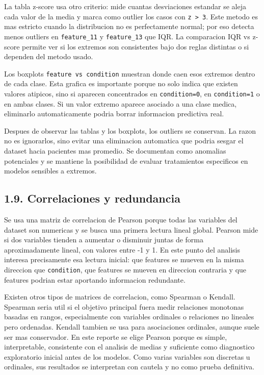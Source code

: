 \documentclass[11pt]{article}
\begin{document}
La tabla z-score usa otro criterio: mide cuantas desviaciones estandar
se aleja cada valor de la media y marca como outlier los casos con
\texttt{\textbar{}z\textbar{}\ \textgreater{}\ 3}. Este metodo es mas
estricto cuando la distribucion no es perfectamente normal; por eso
detecta menos outliers en \texttt{feature\_11} y \texttt{feature\_13}
que IQR. La comparacion IQR vs z-score permite ver si los extremos son
consistentes bajo dos reglas distintas o si dependen del metodo usado.

Los boxplots \texttt{feature\ vs\ condition} muestran donde caen esos
extremos dentro de cada clase. Esta grafica es importante porque no solo
indica que existen valores atipicos, sino si aparecen concentrados en
\texttt{condition=0}, en \texttt{condition=1} o en ambas clases. Si un
valor extremo aparece asociado a una clase medica, eliminarlo
automaticamente podria borrar informacion predictiva real.

Despues de observar las tablas y los boxplots, los outliers se
conservan. La razon no es ignorarlos, sino evitar una eliminacion
automatica que podria sesgar el dataset hacia pacientes mas promedio. Se
documentan como anomalias potenciales y se mantiene la posibilidad de
evaluar tratamientos especificos en modelos sensibles a extremos.

    \subsection{1.9. Correlaciones y
redundancia}\label{correlaciones-y-redundancia}

Se usa una matriz de correlacion de Pearson porque todas las variables
del dataset son numericas y se busca una primera lectura lineal global.
Pearson mide si dos variables tienden a aumentar o disminuir juntas de
forma aproximadamente lineal, con valores entre -1 y 1. En este punto
del analisis interesa precisamente esa lectura inicial: que features se
mueven en la misma direccion que \texttt{condition}, que features se
mueven en direccion contraria y que features podrian estar aportando
informacion redundante.

Existen otros tipos de matrices de correlacion, como Spearman o Kendall.
Spearman seria util si el objetivo principal fuera medir relaciones
monotonas basadas en rangos, especialmente con variables ordinales o
relaciones no lineales pero ordenadas. Kendall tambien se usa para
asociaciones ordinales, aunque suele ser mas conservador. En este
reporte se elige Pearson porque es simple, interpretable, consistente
con el analisis de medias y suficiente como diagnostico exploratorio
inicial antes de los modelos. Como varias variables son discretas u
ordinales, sus resultados se interpretan con cautela y no como prueba
definitiva.
\end{document}
